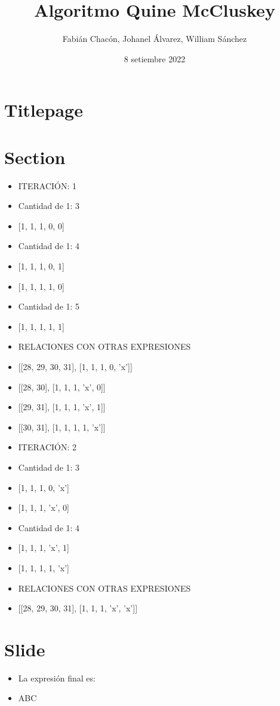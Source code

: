 \documentclass{beamer}%
\title{Algoritmo Quine McCluskey}%
\author{Fabián Chacón, Johanel Álvarez, William Sánchez}%
\date{8 setiembre 2022}%
\begin{document}
%
\normalsize%
\section{Titlepage}%
\label{sec:Titlepage}%
\maketitle

%
\section{Section}%
\label{sec:Section}%
\begin{itemize}%
\item%
ITERACIÓN: 1%
\item%
Cantidad de 1: 3%
\item%
{[}1, 1, 1, 0, 0{]}%
\item%
Cantidad de 1: 4%
\item%
{[}1, 1, 1, 0, 1{]}%
\item%
{[}1, 1, 1, 1, 0{]}%
\item%
Cantidad de 1: 5%
\item%
{[}1, 1, 1, 1, 1{]}%
\newpage%
\item%
RELACIONES CON OTRAS EXPRESIONES%
\item%
{[}{[}28, 29, 30, 31{]}, {[}1, 1, 1, 0, 'x'{]}{]}%
\item%
{[}{[}28, 30{]}, {[}1, 1, 1, 'x', 0{]}{]}%
\item%
{[}{[}29, 31{]}, {[}1, 1, 1, 'x', 1{]}{]}%
\item%
{[}{[}30, 31{]}, {[}1, 1, 1, 1, 'x'{]}{]}%
\newpage%
\item%
ITERACIÓN: 2%
\item%
Cantidad de 1: 3%
\item%
{[}1, 1, 1, 0, 'x'{]}%
\item%
{[}1, 1, 1, 'x', 0{]}%
\item%
Cantidad de 1: 4%
\item%
{[}1, 1, 1, 'x', 1{]}%
\item%
{[}1, 1, 1, 1, 'x'{]}%
\newpage%
\item%
RELACIONES CON OTRAS EXPRESIONES%
\item%
{[}{[}28, 29, 30, 31{]}, {[}1, 1, 1, 'x', 'x'{]}{]}%
\newpage%
\end{itemize}

%
\section{Slide}%
\label{sec:Slide}%
\begin{itemize}%
\item%
La expresión final es:%
\item%
ABC%
\end{itemize}

%
\end{document}
